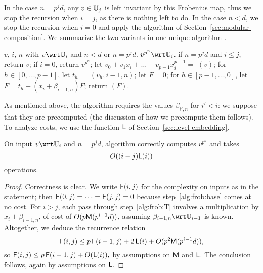 In the case $n=p^jd$, any $v \in \mathbb{U}_j$ is left invariant by this
Frobenius map, thus we stop the recursion when $i=j$, as there is
nothing left to do. In the case $n<d$, we stop the recursion when
$i=0$ and apply the algorithm of
Section~\ref{sec:modular-composition}. We summarize the two variants
in one unique algorithm
.

\begin{algorithm}
  \caption{}
  \label{alg:iterfrobenius}
  \begin{algorithmic}[1]
    \REQUIRE $v$, $i$, $n$ with $v\wrt\U_i$ and $n<d$ or $n=p^jd$.
    \ENSURE $v^{p^n} \wrt \U_i$.
    \STATE \label{alg:frob:base} if $n=p^jd$ and $i \le j$, return $v$;
    \STATE \label{alg:frob:base2} if $i=0$, return $v^{p^n}$;
    \STATE \label{alg:frob:push} let $v_0 + v_1 x_i + \dots + v_{p-1} x_i^{p-1}=$ $(v)$;
    \STATE \label{alg:frob:rec} for $h \in [0,\dots,p-1]$, let $t_h =$ $(v_h, i-1, n)$;
    \STATE let $F=0$;
    \STATE\label{alg:frob:T} for $h \in [p-1,\dots,0]$, let $F = t_h +  (x_i+\beta_{i-1,n})F$;
    \STATE \label{alg:frob:lift} return $(F)$.
  \end{algorithmic}
\end{algorithm}

As mentioned above, the algorithm requires the values $\beta_{i',n}$
for $i'<i$: we suppose that they are precomputed (the discussion of
how we precompute them follows).  To analyze costs, we use the
function $\mathsf{L}$ of Section~\ref{sec:level-embedding}.
\begin{theorem}
  \label{th:b-ifrob}
  On input $v\wrt\U_i$ and $n=p^jd$, algorithm 
  correctly computes $v^{p^n}$ and takes 
  \begin{equation}
    \label{eq:95}
    O((i-j)\mathsf{L}(i))
  \end{equation}
  operations.
\end{theorem}
\begin{proof}
  Correctness is clear. We write $\mathsf{F}(i,j)$ for the complexity on
  inputs as in the statement; then $\mathsf{F}(0,j)=\cdots=\mathsf{F}(j,j)=0$
  because step~\ref{alg:frob:base} comes at no cost. For $i>j$, each
  pass through step~\ref{alg:frob:T} involves a multiplication by
  $x_i+\beta_{i-1,n}$, of cost of $O(p\mathsf{M}(p^{i-1}d))$, assuming
  $\beta_{i-1,n}\wrt \U_{i-1}$ is known. Altogether, we deduce the
  recurrence relation
  \begin{equation}
    \mathsf{F}(i,j) \le
    p\,\mathsf{F}(i-1,j)+2\,\mathsf{L}(i)+O(p^2\mathsf{M}(p^{i-1}d))
    \text{,}
  \end{equation}
  so $\mathsf{F}(i,j) \le p\,\mathsf{F}(i-1,j)+O(\mathsf{L}(i)),$ by assumptions on
  $\mathsf{M}$ and $\mathsf{L}$.  The conclusion follows, again by assumptions
  on $\mathsf{L}$.
\end{proof}

